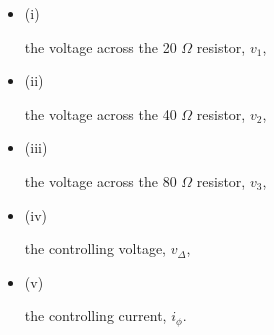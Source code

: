 \documentclass[12pt]{article}
\newcommand{\bit}{\begin{itemize}}
\newcommand{\eit}{\end{itemize}}
\begin{document}
\bit

\item[(i)]

the voltage across the 20 $\Omega$ resistor, $v_{1}$, 

\item[(ii)]

the voltage across the 40 $\Omega$ resistor, $v_{2}$, 

\item[(iii)]

the voltage across the 80 $\Omega$ resistor, $v_{3}$, 

\item[(iv)]

the controlling voltage, $v_{\Delta}$, 

\item[(v)]

the controlling current, $i_{\phi}$. 

\eit
\end{document}
